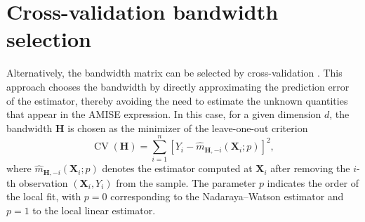 \documentclass[12pt]{report} %
\newcommand{\bH}{\mathbf{H}}
\newcommand{\bX}{\mathbf{X}}
\begin{document}

\section{Cross-validation bandwidth selection}

Alternatively, the bandwidth matrix can be selected by cross-validation \citep{Bowman1984}. This approach chooses the bandwidth by directly approximating the prediction error of the estimator, thereby avoiding the need to estimate the unknown quantities that appear in the AMISE expression. In this case, for a given dimension $d$, the bandwidth $\bH$ is chosen as the minimizer of the leave-one-out criterion
\begin{equation}
    \label{eq:cv-bandwidth}
    \operatorname{CV}(\bH)
    = \sum_{i=1}^{n}
    \left[ Y_i - \hat{m}_{\bH, -i}(\bX_i; p)\right]^2,
\end{equation}
where $\hat{m}_{\bH,-i}(\bX_i;p)$ denotes the estimator computed at $\bX_i$ after removing the $i$-th observation $(\bX_i,Y_i)$ from the sample. The parameter $p$ indicates the order of the local fit, with $p=0$ corresponding to the Nadaraya--Watson estimator and $p=1$ to the local linear estimator.
\end{document}
